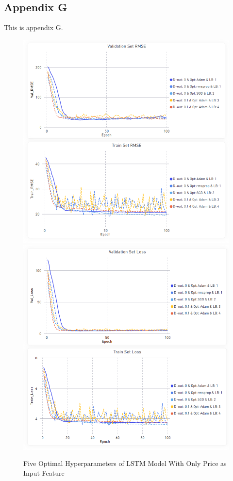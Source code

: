 \documentclass[11pt, a4paper]{article}
\begin{document}
\subsection{Appendix G}
\label{appendix:RMSE_Loss_Best_Model}
This is appendix G.
\begin{figure}[!hb]
    \centering
    \includegraphics[scale = 0.4]{Only_Price_Params_RMSE.png}
    \includegraphics[scale = 0.4]{Only_Price_Params_Loss.png}
    \caption{Five Optimal Hyperparameters of LSTM Model With Only Price as Input Feature}
    \label{fig:lstm_price_rmse_loss}
\end{figure}
\end{document}
